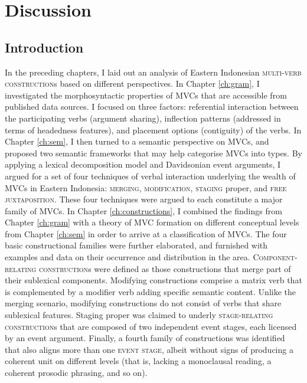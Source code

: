 \chapter{Discussion}\label{ch:discussion}
\section{Introduction}

In the preceding chapters, I laid out an analysis of Eastern Indonesian \textsc{multi-verb construction}s based on different perspectives. In Chapter \ref{ch:gram}, I investigated the morphosyntactic properties of MVCs that are accessible from published data sources. I focused on three factors: referential interaction between the participating verbs (argument sharing), inflection patterns (addressed in terms of headedness features), and placement options (contiguity) of the verbs. In Chapter \ref{ch:sem}, I then turned to a semantic perspective on MVCs, and proposed two semantic frameworks that may help categorise MVCs into types. By applying a lexical decomposition model and Davidsonian event arguments, I argued for a set of four techniques of verbal interaction underlying the wealth of MVCs in Eastern Indonesia: \textsc{merging}, \textsc{modification}, \textsc{staging} proper, and \textsc{free juxtaposition}. These four techniques were argued to each constitute a major family of MVCs. In Chapter \ref{ch:constructions}, I combined the findings from Chapter \ref{ch:gram} with a theory of MVC formation on different conceptual levels from Chapter \ref{ch:sem} in order to arrive at a classification of MVCs. The four basic constructional families were further elaborated, and furnished with examples and data on their occurrence and distribution in the area. \textsc{Component-relating construction}s were defined as those constructions that merge part of their sublexical components. Modifying constructions comprise a matrix verb that is complemented by a modifier verb adding specific semantic content. Unlike the merging scenario, modifying constructions do not consist of verbs that share sublexical features. Staging proper was claimed to underly \textsc{stage-relating construction}s that are composed of two independent event stages, each licensed by an event argument. Finally, a fourth family of constructions was identified that also aligns more than one \textsc{event stage}, albeit without signs of producing a coherent unit on different levels (that is, lacking a monoclausal reading, a coherent prosodic phrasing, and so on).

